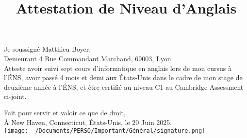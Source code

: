 \documentclass{article}
\title{Attestation de Niveau d'Anglais}
\author{}
\date{}
\begin{document}
\maketitle

\noindent Je soussigné Matthieu Boyer,\\
\noindent Demeurant 4 Rue Commandant Marchand, 69003, Lyon\\
\noindent Atteste avoir suivi sept cours d'informatique en anglais lors de mon cursus à
l'ÉNS, avoir passé 4 mois et demi aux États-Unis dans le cadre de mon stage de
deuxième année à l'ÉNS, et être certifié au niveau C1 au Cambridge Assessment
ci-joint.

\medskip

{\flushright Fait pour servir et valoir ce que de droit,\\
	À New Haven, Connecticut, États-Unis, le 20 Juin 2025,\\[2em]
	\hfill \texttt{[image: ~/Documents/PERSO/Important/Général/signature.png]}}
\end{document}
